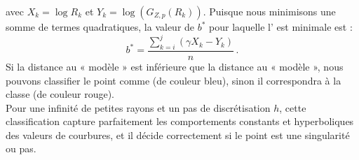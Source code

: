 %
avec $X_k=\log R_k$ et $Y_k=\log(G_{Z,p}(R_k))$. Puisque nous minimisons une
somme de termes quadratiques, la valeur de $b^*$ pour laquelle
l' est minimale est :
%
\begin{equation}
  b^* = \frac{\sum_{k=i}^j ( \gamma X_k - Y_k)}{n}\,.
\end{equation}
%
Si la distance au « modèle \featsmooth » est inférieure que la distance au «
modèle \featedge », nous pouvons classifier le point comme \featsmooth (de
couleur bleu), sinon il correspondra à la classe \featedge (de couleur rouge).
%
\\
%
Pour une infinité de petites rayons et un pas de discrétisation $h$, cette
classification capture parfaitement les comportements constants et hyperboliques
des valeurs de courbures, et il décide correctement si le point est une
singularité ou pas.
%
